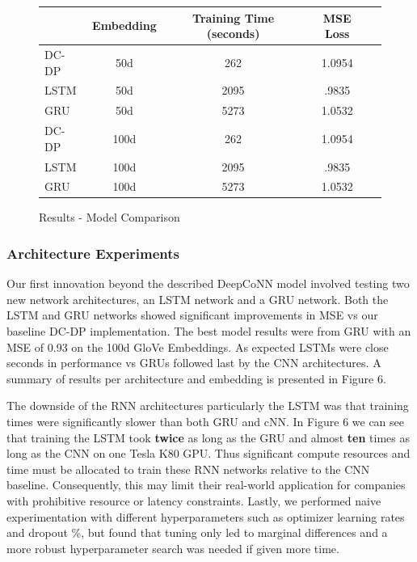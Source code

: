 \documentclass[10pt,twocolumn,letterpaper]{article}
\begin{document}
\begin{figure}[!h]
\begin{center}
{\small
\begin{tabular}{l|cccc}
\hline
 & Embedding & Training Time (seconds) & MSE Loss \\
\hline
DC-DP & 50d & 262 & 1.0954   \\
LSTM & 50d & 2095 & .9835  \\
GRU & 50d & 5273 & 1.0532  \\
DC-DP & 100d  & 262 & 1.0954   \\
LSTM & 100d & 2095 & .9835  \\
GRU & 100d & 5273 & 1.0532  \\
\hline
\end{tabular}
}
\end{center}
\caption{Results - Model Comparison}
\end{figure}

\subsubsection{Architecture Experiments}
Our first innovation beyond the described DeepCoNN model involved testing two new network architectures, an LSTM network and a GRU network. Both the LSTM and GRU networks showed significant improvements in MSE vs our baseline DC-DP implementation. The best model results were from GRU with an MSE of 0.93 on the 100d GloVe Embeddings. As expected LSTMs were close seconds in performance vs GRUs followed last by the CNN architectures. A summary of results per architecture and embedding is presented in Figure 6.

The downside of the RNN architectures particularly the LSTM was that training times were significantly slower than both GRU and cNN. In Figure 6 we can see that training the LSTM took \textbf{twice} as long as the GRU and almost \textbf{ten} times as long as the CNN on one Tesla K80 GPU. Thus significant compute resources and time must be allocated to train these RNN networks relative to the CNN baseline. Consequently, this may limit their real-world application for companies with prohibitive resource or latency constraints. 
Lastly, we performed naive experimentation with different hyperparameters such as optimizer learning rates and dropout \%, but found that tuning only led to marginal differences and a more robust hyperparameter search was needed if given more time.
\end{document}
